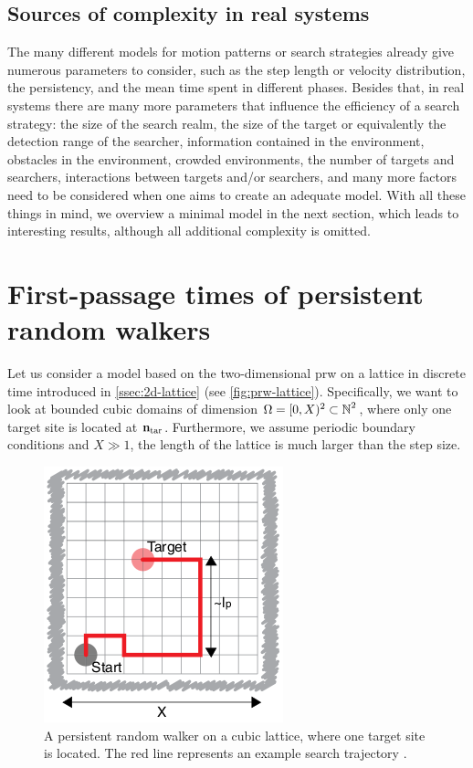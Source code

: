 \subsection{Sources of complexity in real systems}
The many different models for motion patterns or search strategies already give numerous parameters to consider, such as \eg the step length or velocity distribution, the persistency, and the mean time spent in different phases. Besides that, in real systems there are many more parameters that influence the efficiency of a search strategy: the size of the search realm, the size of the target or equivalently the detection range of the searcher, information contained in the environment, obstacles in the environment, crowded environments, the number of targets and searchers, interactions between targets and/or searchers, and many more factors need to be considered when one aims to create an adequate model. With all these things in mind, we overview a minimal model in the next section, which leads to interesting results, although all additional complexity is omitted.

\section{First-passage times of persistent random walkers}
Let us consider a model based on the two-dimensional \ac{prw} on a lattice in discrete time introduced in \autoref{ssec:2d-lattice} (see \autoref{fig:prw-lattice}). Specifically, we want to look at bounded cubic domains of dimension $\Omega = [0,X)^2 \subset \operatorname{\mathbb{N}}^2$, where only one target site is located at $\mathbf{n}_\textrm{tar}$. Furthermore, we assume periodic boundary conditions and $X \gg 1$, \ie the length of the lattice is much larger than the step size.

\begin{figure}[bth]
 \myfloatalign
 \includegraphics[width=0.4\linewidth]{gfx/prw-lattice}
 \caption[Persistent random walk on a lattice]{A persistent random walker on a cubic lattice, where one target site is located. The red line represents an example search trajectory \cite{tejedor:2012}.}\label{fig:prw-lattice}
\end{figure}

